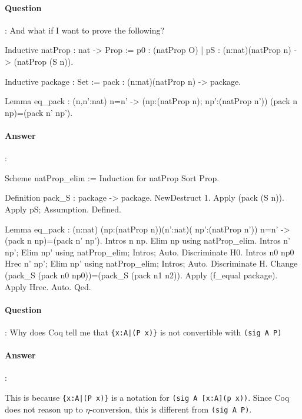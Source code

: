 \documentclass{article}
\begin{document}
\paragraph{Question}: And what if I want to prove the following?

\begin{coq_example*}
Inductive natProp : nat -> Prop
   := p0 : (natProp O)
   |  pS : (n:nat)(natProp n) -> (natProp (S n)).

Inductive package : Set
   := pack : (n:nat)(natProp n) -> package.

Lemma eq_pack
   : (n,n':nat)
     n=n' ->
     (np:(natProp n); np':(natProp n'))
     (pack n np)=(pack n' np').
\end{coq_example*}

\paragraph{Answer}:

\begin{coq_example*}
Scheme natProp_elim := Induction for natProp Sort Prop.

Definition pack_S : package -> package. 
NewDestruct 1.
Apply (pack (S n)).
Apply pS; Assumption.
Defined.

Lemma eq_pack
   : (n:nat)
     (np:(natProp n))(n':nat)( np':(natProp n'))
     n=n' -> 
     (pack n np)=(pack n' np').
Intros n np.
Elim np using natProp_elim.
Intros n' np'; Elim np' using natProp_elim; Intros; Auto. 
Discriminate H0.
Intros n0 np0 Hrec n' np'; Elim np' using natProp_elim; Intros; Auto. 
Discriminate H.
Change (pack_S (pack n0 np0))=(pack_S (pack n1 n2)).
Apply (f_equal package).
Apply Hrec.
Auto.
Qed.
\end{coq_example*}

\paragraph{Question}: Why does Coq tell me that \texttt{\{x:A|(P x)\}} is not convertible with \texttt{(sig A P)}

\paragraph{Answer}:

This is because \texttt{\{x:A|(P x)\}} is a notation for \texttt{(sig A [x:A](p x))}. Since Coq does not reason up to $\eta$-conversion, this is different from
\texttt{(sig A P)}.
\end{document}
